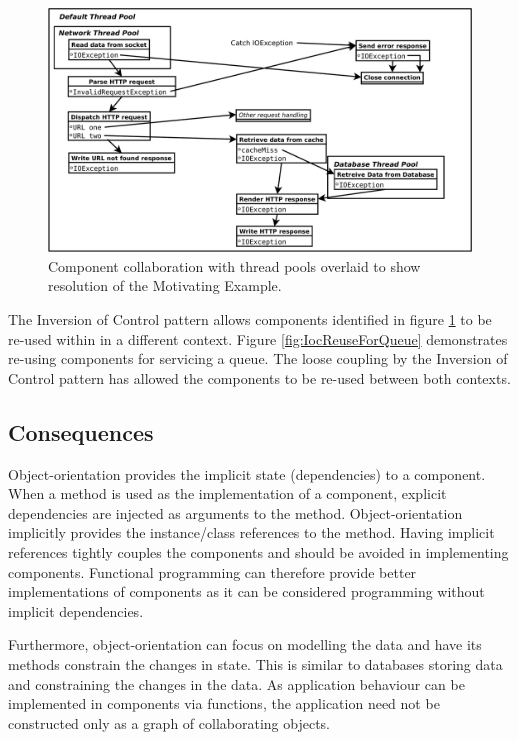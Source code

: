 \documentclass[prodmode]{style/acmlarge}
\begin{document}
\begin{figure}[t]
\centering
\includegraphics[width=4.5in]{IocMotivatingExampleResolved}
\caption{Component collaboration with thread pools overlaid to show resolution of the Motivating Example.}
\label{fig:IocMotivatingExampleResolved}
\end{figure}

The Inversion of Control pattern allows components identified in figure
\ref{fig:IocMotivatingExampleResolved} to be re-used within in a different
context. Figure \ref{fig:IocReuseForQueue} demonstrates re-using components for
servicing a queue.  The loose coupling by the Inversion of Control pattern has
allowed the components to be re-used between both contexts.


\subsection{Consequences}

Object-orientation provides the implicit state (dependencies) to a component.
When a method is used as the implementation of a component, explicit
dependencies are injected as arguments to the method.  Object-orientation
implicitly provides the instance/class references to the method.  Having
implicit references tightly couples the components and should be avoided in
implementing components.  Functional programming can therefore provide better
implementations of components as it can be considered programming without
implicit dependencies.

Furthermore, object-orientation can focus on modelling the data and have its
methods constrain the changes in state.  This is similar to databases storing
data and constraining the changes in the data.  As application behaviour can be
implemented in components via functions, the application need not be constructed
only as a graph of collaborating objects.
\end{document}
